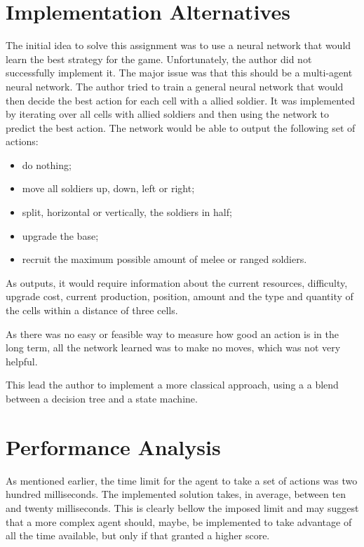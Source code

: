 \documentclass[conference]{IEEEtran}
\begin{document}
\section{Implementation Alternatives}

The initial idea to solve this assignment was to use a neural network that would learn the best strategy for the game. Unfortunately, the author did not successfully implement it. The major issue was that this should be a multi-agent neural network. The author tried to train a general neural network that would then decide the best action for each cell with a allied soldier. It was implemented by iterating over all cells with allied soldiers and then using the network to predict the best action. The network would be able to output the following set of actions:

\begin{itemize}
    \item do nothing;
    \item move all soldiers up, down, left or right;
    \item split, horizontal or vertically, the soldiers in half;
    \item upgrade the base;
    \item recruit the maximum possible amount of melee or ranged soldiers.
\end{itemize}

As outputs, it would require information about the current resources, difficulty, upgrade cost, current production, position, amount and the type and quantity of the cells within a distance of three cells.

As there was no easy or feasible way to measure how good an action is in the long term, all the network learned was to make no moves, which was not very helpful.

This lead the author to implement a more classical approach, using a a blend between a decision tree and a state machine.

\section{Performance Analysis}

As mentioned earlier, the time limit for the agent to take a set of actions was two hundred milliseconds. The implemented solution takes, in average, between ten and twenty milliseconds. This is clearly bellow the imposed limit and may suggest that a more complex agent should, maybe, be implemented to take advantage of all the time available, but only if that granted a higher score.
\end{document}
